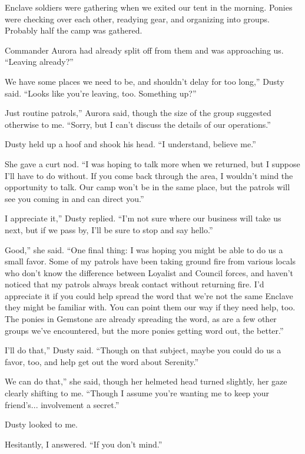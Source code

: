 Enclave soldiers were gathering when we exited our tent in the morning. Ponies were checking over each other, readying gear, and organizing into groups. Probably half the camp was gathered.

Commander Aurora had already split off from them and was approaching us. “Leaving already?”

\leavevmode{}We have some places we need to be, and shouldn’t delay for too long,” Dusty said. “Looks like you’re leaving, too. Something up?”

\leavevmode{}Just routine patrols,” Aurora said, though the size of the group suggested otherwise to me. “Sorry, but I can’t discuss the details of our operations.”

Dusty held up a hoof and shook his head. “I understand, believe me.”

She gave a curt nod. “I was hoping to talk more when we returned, but I suppose I’ll have to do without. If you come back through the area, I wouldn’t mind the opportunity to talk. Our camp won’t be in the same place, but the patrols will see you coming in and can direct you.”

\leavevmode{}I appreciate it,” Dusty replied. “I’m not sure where our business will take us next, but if we pass by, I’ll be sure to stop and say hello.”

\leavevmode{}Good,” she said. “One final thing: I was hoping you might be able to do us a small favor. Some of my patrols have been taking ground fire from various locals who don’t know the difference between Loyalist and Council forces, and haven’t noticed that my patrols always break contact without returning fire. I’d appreciate it if you could help spread the word that we’re not the same Enclave they might be familiar with. You can point them our way if they need help, too. The ponies in Gemstone are already spreading the word, as are a few other groups we’ve encountered, but the more ponies getting word out, the better.”

\leavevmode{}I’ll do that,” Dusty said. “Though on that subject, maybe you could do us a favor, too, and help get out the word about Serenity.”

\leavevmode{}We can do that,” she said, though her helmeted head turned slightly, her gaze clearly shifting to me. “Though I assume you’re wanting me to keep your friend’s... involvement a secret.”

Dusty looked to me.

Hesitantly, I answered. “If you don’t mind.”

